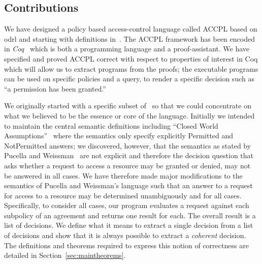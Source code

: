 \documentclass[runningheads,a4paper]{llncs}
\begin{document}
\subsection{Contributions}\label{sec:contribs}

We have designed a policy based access-control language called \ac{ACCPL} based on \ac{odrl} and starting with definitions in~\cite{pucella2006}. The \ac{ACCPL} framework has been encoded in \emph{Coq}~\cite{BC04} which is both a programming language and a proof-assistant. We have specified and proved \ac{ACCPL} correct with respect to properties of interest in Coq which will allow us to extract programs from the proofs; the executable programs can be used on specific policies and a query, to render a specific decision such as ``a permission has been granted.'' 

We originally started with a specific subset of~\cite{pucella2006} so that we could concentrate on what we believed to be the essence or core of the language. Initially we intended to maintain the central semantic definitions including ``Closed World Assumptions''~\cite{pucella2006} where the semantics only specify explicitly Permitted and NotPermitted answers; we discovered, however, that the semantics as stated by Pucella and Weissman~\cite{pucella2006} are not explicit and therefore the decision question that asks whether a request to access a resource may be granted or denied, may not be answered in all cases. We have therefore made major modifications to the semantics of Pucella and Weissman's language such that an answer to a request for access to a resource may be determined unambiguously and for all cases. 
%
Specifically, to consider all cases, our program evaluates a request
against each subpolicy of an agreement and returns one result for
each.  The overall result is a list of decisions.  We define what it
means to extract a single decision from a list of decisions and show
that it is always possible to extract a \emph{coherent} decision.  The
definitions and theorems required to express this notion of
correctness are detailed in Section~\ref{sec:maintheorems}.

\end{document}
